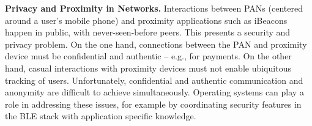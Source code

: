 \smallskip\noindent
\textbf{Privacy and Proximity in Networks.}
Interactions between PANs (centered around a user's mobile phone)
and proximity applications such as iBeacons happen in public, with
never-seen-before peers. This presents a security and privacy problem. On
the one hand, connections between the PAN and proximity device must be
confidential and authentic -- e.g., for payments.
On the other hand, casual interactions with
proximity devices must not enable ubiquitous tracking of users. Unfortunately,
confidential and authentic communication and anonymity are difficult to
achieve simultaneously.
%
Operating systems can play a role in addressing these issues, for example 
by coordinating
security features in the BLE stack with application specific knowledge.

%

